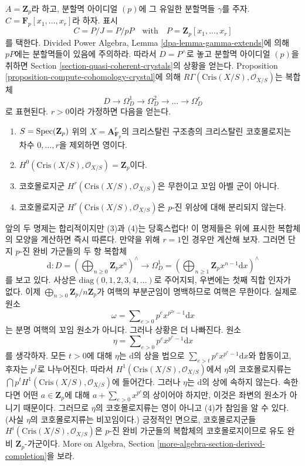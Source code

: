 \begin{example}
\label{example-affine-n-space}
$A = \mathbf{Z}_p$라 하고, 분할멱 아이디얼 $(p)$에 그 유일한
분할멱들 $\gamma$를 주자. $C = \mathbf{F}_p[x_1, \ldots, x_r]$라
하자. 표시
$$
C = P/J = P/pP\quad\text{with}\quad P = \mathbf{Z}_p[x_1, \ldots, x_r]
$$
를 택한다. Divided Power Algebra, Lemma
\ref{dpa-lemma-gamma-extends}에 의해 $pP$에는 분할멱들이 있음에
주의하라. 따라서 $D = P^\wedge$로 놓고 분할멱 아이디얼 $(p)$을
취하면 Section \ref{section-quasi-coherent-crystals}의 상황을 얻는다.
Proposition \ref{proposition-compute-cohomology-crystal}에 의해
$R\Gamma(\text{Cris}(X/S), \mathcal{O}_{X/S})$는 복합체
$$
D \to \Omega^1_D \to \Omega^2_D \to \ldots \to \Omega^r_D
$$
로 표현된다. $r > 0$이라 가정하면 다음을 얻는다.
\begin{enumerate}
\item $S = \mathop{\mathrm{Spec}}(\mathbf{Z}_p)$ 위의
$X = \mathbf{A}^r_{\mathbf{F}_p}$의 크리스탈린 구조층의 크리스탈린
코호몰로지는 차수 $0, \ldots, r$을 제외하면 영이다.
\item $H^0(\text{Cris}(X/S), \mathcal{O}_{X/S}) = \mathbf{Z}_p$이다.
\item 코호몰로지군 $H^r(\text{Cris}(X/S), \mathcal{O}_{X/S})$은
무한이고 꼬임 아벨 군이 아니다.
\item 코호몰로지군 $H^r(\text{Cris}(X/S), \mathcal{O}_{X/S})$은
$p$-진 위상에 대해 분리되지 않는다.
\end{enumerate}
앞의 두 명제는 합리적이지만 (3)과 (4)는 당혹스럽다! 이 명제들은
위에 표시한 복합체의 모양을 계산하면 즉시 따른다. 만약을 위해
$r = 1$인 경우만 계산해 보자. 그러면 단지 $p$-진 완비 가군들의
두 항 복합체
$$
\text{d} :
D = \left(
\bigoplus\nolimits_{n \geq 0} \mathbf{Z}_p x^n
\right)^\wedge
\longrightarrow
\Omega^1_D = \left(
\bigoplus\nolimits_{n \geq 1} \mathbf{Z}_p x^{n - 1}\text{d}x
\right)^\wedge
$$
를 보고 있다. 사상은 $\text{diag}(0, 1, 2, 3, 4, \ldots)$로
주어지되, 우변에는 첫째 직합 인자가 없다. 이제
$\bigoplus_{n > 0} \mathbf{Z}_p/n\mathbf{Z}_p$가 여핵의 부분군임이
명백하므로 여핵은 무한이다. 실제로 원소
$$
\omega = \sum\nolimits_{e > 0} p^e x^{p^{2e} - 1}\text{d}x
$$
는 분명 여핵의 꼬임 원소가 아니다. 그러나 상황은 더 나빠진다.
원소
$$
\eta = \sum\nolimits_{e > 0} p^e x^{p^e - 1}\text{d}x
$$
를 생각하자. 모든 $t > 0$에 대해 $\eta$는 $\text{d}$의 상을
법으로 $\sum_{e > t} p^e x^{p^e - 1}\text{d}x$와 합동이고,
후자는 $p^t$로 나누어진다. 따라서 $H^1(\text{Cris}(X/S),
\mathcal{O}_{X/S})$에서 $\eta$의 코호몰로지류는
$\bigcap p^tH^1(\text{Cris}(X/S), \mathcal{O}_{X/S})$에 들어간다.
그러나 $\eta$는 $\text{d}$의 상에 속하지 않는다. 속한다면 어떤
$a \in \mathbf{Z}_p$에 대해 $a + \sum_{e > 0} x^{p^e}$의 상이어야
하지만, 이것은 좌변의 원소가 아니기 때문이다. 그러므로 $\eta$의
코호몰로지류는 영이 아니고 (4)가 참임을 알 수 있다. (사실
$\eta$의 코호몰로지류는 비꼬임이다.) 긍정적인 면으로,
코호몰로지군들 $H^i(\text{Cris}(X/S), \mathcal{O}_{X/S})$은
$p$-진 완비 가군들의 복합체의 코호몰로지이므로 유도 완비
$\mathbf{Z}_p$-가군이다. More on Algebra, Section
\ref{more-algebra-section-derived-completion}을 보라.
\end{example}








